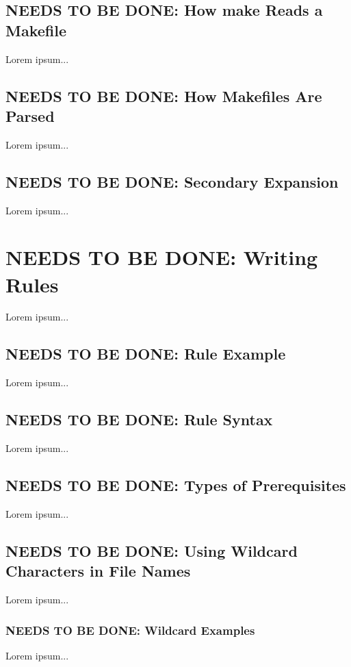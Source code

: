 \documentclass{charun}
\begin{document}
\begin{multicols*}{2}
\color{gray}
\subsection{NEEDS TO BE DONE: How make Reads a Makefile}
Lorem ipsum...
\color{black}

\color{gray}
\subsection{NEEDS TO BE DONE: How Makefiles Are Parsed}
Lorem ipsum...
\color{black}

\color{gray}
\subsection{NEEDS TO BE DONE: Secondary Expansion}
Lorem ipsum...
\color{black}


\color{gray}
\section{NEEDS TO BE DONE: Writing Rules}
Lorem ipsum...
\color{black}


\color{gray}
\subsection{NEEDS TO BE DONE: Rule Example}
Lorem ipsum...
\color{black}

\color{gray}
\subsection{NEEDS TO BE DONE: Rule Syntax}
Lorem ipsum...
\color{black}

\color{gray}
\subsection{NEEDS TO BE DONE: Types of Prerequisites}
Lorem ipsum...
\color{black}

\color{gray}
\subsection{NEEDS TO BE DONE: Using Wildcard Characters in File Names}
Lorem ipsum...
\color{black}

\color{gray}
\subsubsection{NEEDS TO BE DONE: Wildcard Examples}
Lorem ipsum...
\color{black}


\end{multicols*}
\end{document}
